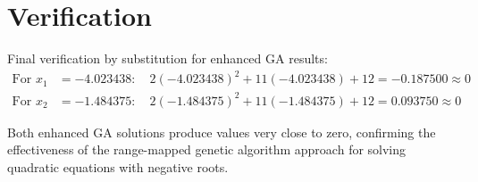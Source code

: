 \documentclass[11pt,a4paper]{article}
\begin{document}
\section{Verification}
Final verification by substitution for enhanced GA results:
\begin{align}
\text{For } x_1 &= -4.023438: \quad 2(-4.023438)^2 + 11(-4.023438) + 12 = -0.187500 \approx 0\\
\text{For } x_2 &= -1.484375: \quad 2(-1.484375)^2 + 11(-1.484375) + 12 = 0.093750 \approx 0
\end{align}

Both enhanced GA solutions produce values very close to zero, confirming the effectiveness of the range-mapped genetic algorithm approach for solving quadratic equations with negative roots.
\end{document}
